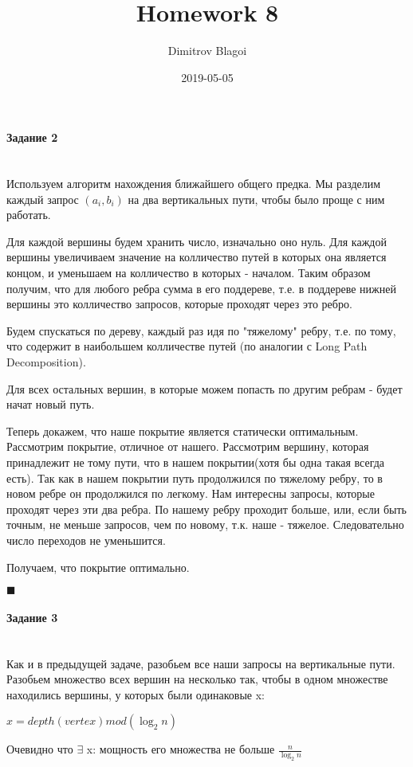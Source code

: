 \documentclass{article}
\title{Homework 8}
\date{2019-05-05}
\author{Dimitrov Blagoi}
\newcommand{\myparagraph}[1]{\paragraph{#1}\mbox{}\\}
\begin{document}
  \maketitle
  \newpage

  \newpage

  \myparagraph{Задание 2}
  Используем алгоритм нахождения ближайшего общего предка. Мы разделим каждый
  запрос $(a_{i}, b_{i})$ на два вертикальных пути, чтобы было проще с ним работать.

  Для каждой вершины будем хранить число, изначально оно нуль. Для каждой вершины
  увеличиваем значение на колличество путей в которых она является концом, и уменьшаем на колличество
  в которых - началом. Таким образом получим, что для любого ребра сумма в его поддереве, т.е.
  в поддереве нижней вершины это колличество запросов, которые проходят через это ребро.

  Будем спускаться по дереву, каждый раз идя по "тяжелому" ребру, т.е. по тому, что
  содержит в наибольшем колличестве путей (по аналогии с Long Path Decomposition).

  Для всех остальных вершин, в которые можем попасть по другим ребрам - будет начат новый
  путь.

  Теперь докажем, что наше покрытие является статически оптимальным.
  Рассмотрим покрытие, отличное от нашего. Рассмотрим вершину, которая принадлежит не тому пути,
  что в нашем покрытии(хотя бы одна такая всегда есть). Так как в нашем покрытии путь продолжился по тяжелому ребру,
  то в новом ребре он продолжился по легкому. Нам интересны запросы, которые проходят через эти два ребра.
  По нашему ребру проходит больше, или, если быть точным, не меньше запросов, чем по новому, т.к. наше - тяжелое.
  Следовательно число переходов не уменьшится.

  Получаем, что покрытие оптимально.
  \begin{flushright}
    $\blacksquare$
  \end{flushright}

  \newpage

  \myparagraph{Задание 3}

  Как и в предыдущей задаче, разобьем все наши запросы на вертикальные пути. Разобьем множество всех вершин на несколько так,
  чтобы в одном множестве находились вершины, у которых были одинаковые x:

  $x = depth(vertex) mod (\log_2 n)$

  Очевидно что $\exists$ x: мощность его множества не больше  $\frac{n}{\log_2 n}$
\end{document}
